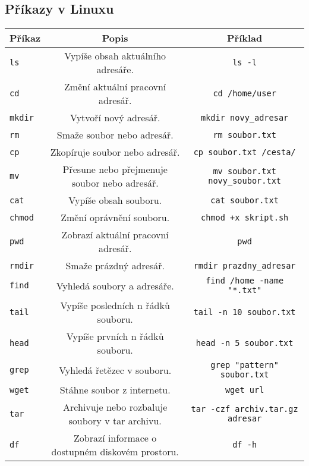 \documentclass{article}
\begin{document}
\subsection{Příkazy v Linuxu}
\begin{center}
\begin{tabular}{|l|c|c|}
\hline
\textbf{Příkaz} & \textbf{Popis} & \textbf{Příklad} \\
\hline
\texttt{ls} & Vypíše obsah aktuálního adresáře. & \texttt{ls -l} \\
\hline
\texttt{cd} & Změní aktuální pracovní adresář. & \texttt{cd /home/user} \\
\hline
\texttt{mkdir} & Vytvoří nový adresář. & \texttt{mkdir novy\_adresar} \\
\hline
\texttt{rm} & Smaže soubor nebo adresář. & \texttt{rm soubor.txt} \\
\hline
\texttt{cp} & Zkopíruje soubor nebo adresář. & \texttt{cp soubor.txt /cesta/} \\
\hline
\texttt{mv} & Přesune nebo přejmenuje soubor nebo adresář. & \texttt{mv soubor.txt novy\_soubor.txt} \\
\hline
\texttt{cat} & Vypíše obsah souboru. & \texttt{cat soubor.txt} \\
\hline
\texttt{chmod} & Změní oprávnění souboru. & \texttt{chmod +x skript.sh} \\
\hline
\texttt{pwd} & Zobrazí aktuální pracovní adresář. & \texttt{pwd} \\
\hline
\texttt{rmdir} & Smaže prázdný adresář. & \texttt{rmdir prazdny\_adresar} \\
\hline
\texttt{find} & Vyhledá soubory a adresáře. & \texttt{find /home -name "*.txt"} \\
\hline
\texttt{tail} & Vypíše posledních n řádků souboru. & \texttt{tail -n 10 soubor.txt} \\
\hline
\texttt{head} & Vypíše prvních n řádků souboru. & \texttt{head -n 5 soubor.txt} \\
\hline
\texttt{grep} & Vyhledá řetězec v souboru. & \texttt{grep "pattern" soubor.txt} \\
\hline
\texttt{wget} & Stáhne soubor z internetu. & \texttt{wget url} \\
\hline
\texttt{tar} & Archivuje nebo rozbaluje soubory v tar archivu. & \texttt{tar -czf archiv.tar.gz adresar} \\
\hline
\texttt{df} & Zobrazí informace o dostupném diskovém prostoru. & \texttt{df -h} \\
\hline
\end{tabular}
\end{center}
\end{document}
